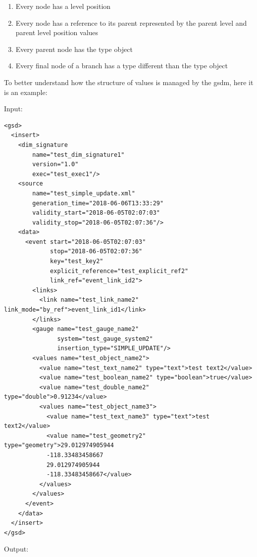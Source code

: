 \begin{enumerate}

\item Every node has a level position
\item Every node has a reference to its parent represented by the parent level and parent level position values
\item Every parent node has the type object
\item Every final node of a branch has a type different than the type object

\end{enumerate}

To better understand how the structure of values is managed by the \acrshort{gsdm}, here it is an example:

Input:
\begin{lstlisting}[style=xml, caption={XML input example for showing the values structure management.}]
<gsd>
  <insert>
    <dim_signature
        name="test_dim_signature1"
        version="1.0"
        exec="test_exec1"/>
    <source
        name="test_simple_update.xml" 
        generation_time="2018-06-06T13:33:29"
        validity_start="2018-06-05T02:07:03"
        validity_stop="2018-06-05T02:07:36"/>
    <data>
      <event start="2018-06-05T02:07:03"
             stop="2018-06-05T02:07:36"
             key="test_key2"
             explicit_reference="test_explicit_ref2"
             link_ref="event_link_id2">
        <links>
          <link name="test_link_name2" link_mode="by_ref">event_link_id1</link>
        </links>
        <gauge name="test_gauge_name2"
               system="test_gauge_system2"
               insertion_type="SIMPLE_UPDATE"/>
        <values name="test_object_name2">
          <value name="test_text_name2" type="text">test text2</value>
          <value name="test_boolean_name2" type="boolean">true</value>
          <value name="test_double_name2" type="double">0.91234</value>
          <values name="test_object_name3">
            <value name="test_text_name3" type="text">test text2</value>
            <value name="test_geometry2" type="geometry">29.012974905944
            -118.33483458667
            29.012974905944
            -118.33483458667</value>
          </values>
        </values>
      </event>
    </data>
  </insert>
</gsd>
\end{lstlisting}

Output:

